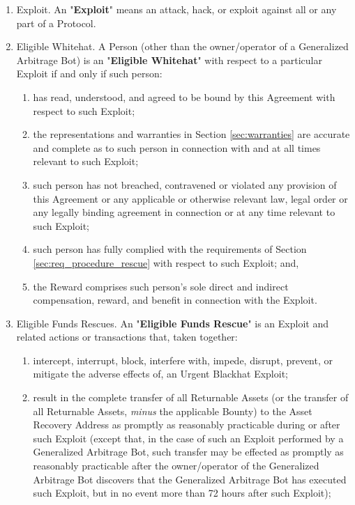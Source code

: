 \documentclass{article}
\begin{document}
\begin{enumerate}
    \item Exploit. An "\textbf{Exploit}" means an attack, hack, or exploit against all or any part of a Protocol.

    \item Eligible Whitehat. A Person (other than the owner/operator of a Generalized Arbitrage Bot) is an "\textbf{Eligible Whitehat}" with respect to a particular Exploit if and only if such person:

          \begin{enumerate}
              \item has read, understood, and agreed to be bound by this Agreement with respect to such Exploit;

              \item the representations and warranties in Section \ref{sec:warranties} are accurate and complete as to such person in connection with and at all times relevant to such Exploit;

              \item such person has not breached, contravened or violated any provision of this Agreement or any applicable or otherwise relevant law, legal order or any legally binding agreement in connection or at any time relevant to such Exploit;

              \item such person has fully complied with the requirements of Section \ref{sec:req_procedure_rescue} with respect to such Exploit; and,

              \item the Reward comprises such person's sole direct and indirect compensation, reward, and benefit in connection with the Exploit.

          \end{enumerate}

    \item Eligible Funds Rescues. An "\textbf{Eligible Funds Rescue}" is an Exploit and related actions or transactions that, taken together:

          \begin{enumerate}
              \item intercept, interrupt, block, interfere with, impede, disrupt, prevent, or mitigate the adverse effects of, an Urgent Blackhat Exploit;

              \item result in the complete transfer of all Returnable Assets (or the transfer of all Returnable Assets, \textit{minus} the applicable Bounty) to the Asset Recovery Address as promptly as reasonably practicable during or after such Exploit (except that, in the case of such an Exploit performed by a Generalized Arbitrage Bot, such transfer may be effected as promptly as reasonably practicable after the owner/operator of the Generalized Arbitrage Bot discovers that the Generalized Arbitrage Bot has executed such Exploit, but in no event more than 72 hours after such Exploit);


\end{enumerate}
\end{enumerate}
\end{document}

